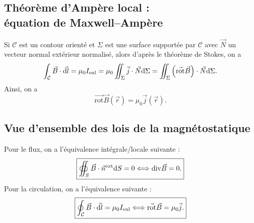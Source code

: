     \subsection[Équation de Maxwell--Ampère]{Théorème d'Ampère local :\\équation de Maxwell--Ampère}

        Si $\mathcal{C}$ est un contour orienté et $\Sigma$ est une surface supportée par $\mathcal{C}$ avec $\vec{N}$ un vecteur normal extérieur normalisé, alors d'après le théorème de Stokes, on a 
        \begin{equation}
            \int_{\mathcal{C}}\vec{B}\cdot\vec{\mathrm{d} l}=\mu_{0}I_{\mathrm{enl}}=\mu_{0}\iint_{\Sigma}\vec{j}\cdot\vec{N}\mathrm{d}\Sigma=\iint_{\Sigma}\left(\vec{\mathrm{rot}}\vec{B}\right)\cdot\vec{N}\mathrm{d}\Sigma.
        \end{equation}
        Ainsi, on a 
        \begin{equation}
            \boxed{
                \vec{\mathrm{rot}}\vec{B}(\vec{r})=\mu_{0}\vec{j}(\vec{r}).
            }
        \end{equation}

    \subsection{Vue d'ensemble des lois de la magnétostatique}

        Pour le flux, on a l'équivalence intégrale/locale suivante :
        \begin{equation}
            \boxed{
                \oiint_{S}\vec{B}\cdot\vec{n}^{\mathrm{ext}}\mathrm{d} S=0\Longleftrightarrow\mathrm{div}\vec{B}=0.
            }
        \end{equation}
        Pour la circulation, on a l'équivalence suivante :
        \begin{equation}
            \boxed{
                \oint_{\mathcal{C}}\vec{B}\cdot\vec{\mathrm{d} l}=\mu_{0}I_{\mathrm{enl}}\Longleftrightarrow\vec{\mathrm{rot}}\vec{B}=\mu_{0}\vec{j}.
            }
        \end{equation}

        